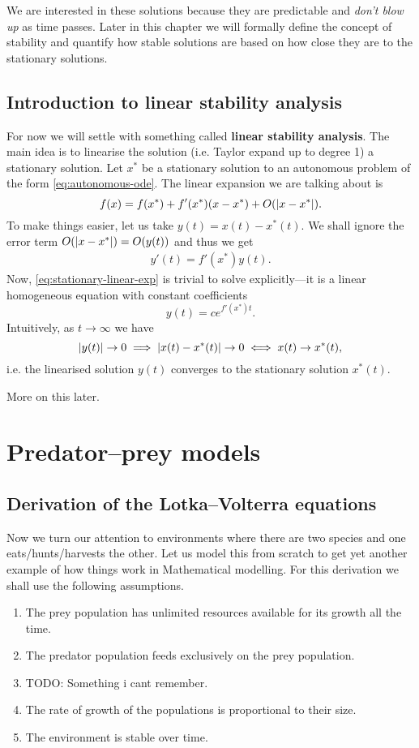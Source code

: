 We are interested in these solutions because they are predictable and
\textit{don't blow up} as time passes. Later in this chapter we will formally
define the concept of stability and quantify how stable solutions are based on
how close they are to the stationary solutions.

\subsection{Introduction to linear stability analysis}

For now we will settle with something called \textbf{linear stability
analysis}. The main idea is to linearise the solution (i.e. Taylor expand up to
degree 1) a stationary solution. Let $x^*$ be a stationary solution to an
autonomous problem of the form \ref{eq:autonomous-ode}. The linear expansion we are talking about is
\[
  f(x) = f(x^*) + f'(x^*)(x - x^*) + O(\left\vert{x - x^*}\right\vert).
\]
To make things easier, let us take $y(t) = x(t) - x^*(t)$. We shall ignore the
error term $O(\left\vert{x - x^*}\right\vert) = O(y(t))$ and thus we get
\begin{align}
  \label{eq:stationary-linear-exp}
  y'(t) = f'(x^*) y(t).  
\end{align}
Now, \ref{eq:stationary-linear-exp} is trivial to solve explicitly---it is a
linear homogeneous equation with constant coefficients
\[
  y(t) = c e^{f'(x^*) t}.
\]
Intuitively, as $t \to \infty$ we have
\[
  \left\vert{y(t)}\right\vert \to 0  \implies \left\vert{x(t) - x^*(t)}\right\vert \to 0 \iff x(t) \to x^*(t),
\]
i.e. the linearised solution $y(t)$ converges to the stationary solution
$x^*(t)$.

More on this later.

\section{Predator--prey models}

\subsection{Derivation of the Lotka--Volterra equations}

Now we turn our attention to environments where there are two species and one
eats/hunts/harvests the other. Let us model this from scratch to get yet
another example of how things work in Mathematical modelling. For this
derivation we shall use the following assumptions.

\begin{enumerate}
  \item The prey population has unlimited resources available for its growth all the time.
  \item The predator population feeds exclusively on the prey population.
  \item TODO: Something i cant remember.
  \item The rate of growth of the populations is proportional to their size.
  \item The environment is stable over time.
\end{enumerate}


